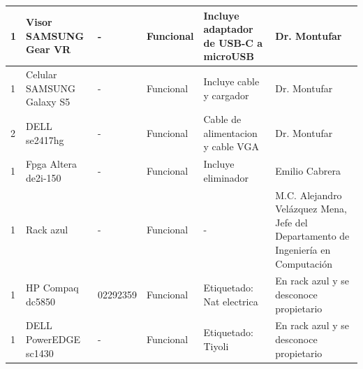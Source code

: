 \documentclass[a4paper,11pt]{article}                 %
\begin{document}
\begin{longtable}{|p{}|p{}|p{}|p{}|p{}|p{}|}
1                          & Visor SAMSUNG Gear VR                     & -                                                                            & Funcional                & Incluye adaptador de USB-C a microUSB                                      & Dr. Montufar                                                                      \\ \hline


1                          & Celular SAMSUNG Galaxy S5                 & -                                                                            & Funcional                & Incluye cable y cargador                                                   & Dr. Montufar                                                                      \\ \hline
2                          & DELL se2417hg                             & -                                                                            & Funcional                & Cable de alimentacion y cable VGA                                          & Dr. Montufar                                            \\ \hline
1                          & Fpga Altera de2i-150                      & -                                                                            & Funcional                & Incluye eliminador                                                         & Emilio Cabrera                                                                    \\ \hline
1                          & Rack azul                                 & -                                                                            & Funcional                & -                                                                 & M.C. Alejandro Velázquez Mena, Jefe del Departamento de Ingeniería en Computación \\ \hline
1                          & HP Compaq dc5850                              & 02292359                                                                            & Funcional                & Etiquetado: Nat electrica                                          & En rack azul y se desconoce propietario                                            \\ \hline
1                          & DELL PowerEDGE sc1430                              & -                                                                            & Funcional                & Etiquetado: Tiyoli                                          & En rack azul y se desconoce propietario                                            \\ \hline
\end{longtable}
\end{document}
